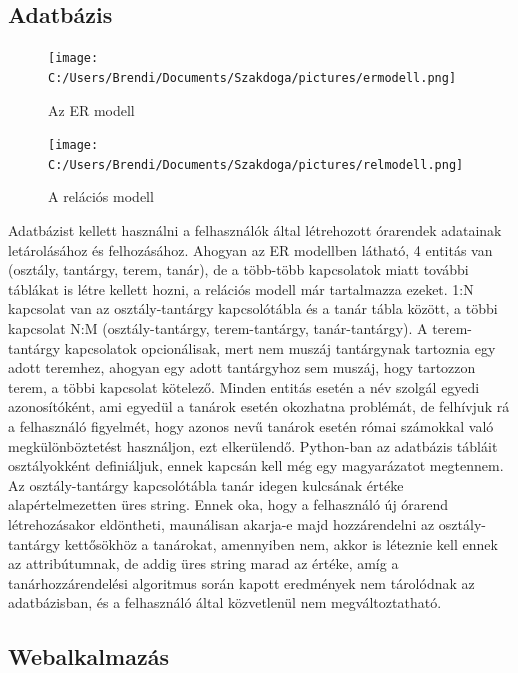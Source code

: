 \documentclass[12pt,a4paper]{report}
\begin{document}
\subsection{Adatbázis}

\begin{figure}
\texttt{[image: C:/Users/Brendi/Documents/Szakdoga/pictures/ermodell.png]}
\caption{Az ER modell}
\end{figure}

\begin{figure}
\texttt{[image: C:/Users/Brendi/Documents/Szakdoga/pictures/relmodell.png]}
\caption{A relációs modell}
\end{figure}

Adatbázist kellett használni a felhasználók által létrehozott órarendek adatainak letárolásához és felhozásához. Ahogyan az ER modellben látható, 4 entitás van (osztály, tantárgy, terem, tanár), de a több-több kapcsolatok miatt további táblákat is létre kellett hozni, a relációs modell már tartalmazza ezeket. 1:N kapcsolat van az osztály-tantárgy kapcsolótábla és a tanár tábla között, a többi kapcsolat N:M (osztály-tantárgy, terem-tantárgy, tanár-tantárgy). A terem-tantárgy kapcsolatok opcionálisak, mert nem muszáj tantárgynak tartoznia egy adott teremhez, ahogyan egy adott tantárgyhoz sem muszáj, hogy tartozzon terem, a többi kapcsolat kötelező. Minden entitás esetén a név szolgál egyedi azonosítóként, ami egyedül a tanárok esetén okozhatna problémát, de felhívjuk rá a felhasználó figyelmét, hogy azonos nevű tanárok esetén római számokkal való megkülönböztetést használjon, ezt elkerülendő. Python-ban az adatbázis tábláit osztályokként definiáljuk, ennek kapcsán kell még egy magyarázatot megtennem. Az osztály-tantárgy kapcsolótábla tanár idegen kulcsának értéke alapértelmezetten üres string. Ennek oka, hogy a felhasználó új órarend létrehozásakor eldöntheti, maunálisan akarja-e majd hozzárendelni az osztály-tantárgy kettősökhöz a tanárokat, amennyiben nem, akkor is léteznie kell ennek az attribútumnak, de addig üres string marad az értéke, amíg a tanárhozzárendelési algoritmus során kapott eredmények nem tárolódnak az adatbázisban, és a felhasználó által közvetlenül nem megváltoztatható.

\subsection{Webalkalmazás}
\end{document}
